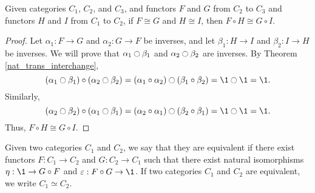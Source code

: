 \documentclass[../../math.tex]{subfiles}
\begin{document}
\begin{theorem}
    Given categories $C_1$, $C_2$, and $C_3$, and functors $F$ and $G$ from
    $C_2$ to $C_3$ and functors $H$ and $I$ from $C_1$ to $C_2$, if $F \cong G$
    and $H \cong I$, then $F \circ H \cong G \circ I$.
\end{theorem}
\begin{proof}
    Let $\alpha_1 : F \to G$ and $\alpha_2 : G \to F$ be inverses, and let
    $\beta_1 : H \to I$ and $\beta_2 : I \to H$ be inverses.  We will prove that
    $\alpha_1 \ocircle \beta_1$ and $\alpha_2 \ocircle \beta_2$ are inverses.
    By Theorem \ref{nat_trans_interchange},
    \[
        (\alpha_1 \ocircle \beta_1) \circ (\alpha_2 \ocircle \beta_2)
        = (\alpha_1 \circ \alpha_2) \ocircle (\beta_1 \circ \beta_2)
        = \1 \ocircle \1 = \1.
    \]
    Similarly,
    \[
        (\alpha_2 \ocircle \beta_2) \circ (\alpha_1 \ocircle \beta_1)
        = (\alpha_2 \circ \alpha_1) \ocircle (\beta_2 \circ \beta_1)
        = \1 \ocircle \1 = \1.
    \]
    Thus, $F \circ H \cong G \circ I$.
\end{proof}

\begin{definition}
    Given two categories $C_1$ and $C_2$, we say that they are equivalent if
    there exist functors $F : C_1 \to C_2$ and $G : C_2 \to C_1$ such that there
    exist natural isomorphisms $\eta : \1 \to G \circ F$ and $\varepsilon : F
    \circ G \to \1$.  If two categories $C_1$ and $C_2$ are equivalent, we write
    $C_1 \simeq C_2$.
\end{definition}
\end{document}
